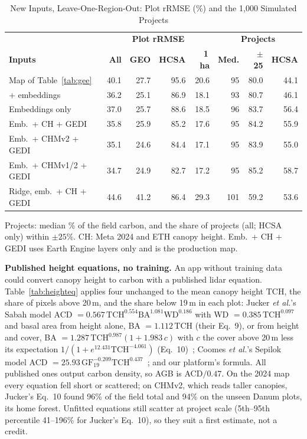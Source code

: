 \documentclass[conference,a4paper]{IEEEtran}
\begin{document}
\begin{table}[t]
\centering
\caption{New Inputs, Leave-One-Region-Out: Plot rRMSE (\%) and the 1{,}000 Simulated Projects}
\label{tab:prodinputs}
\footnotesize
\setlength{\tabcolsep}{1.6pt}
\begin{tabular}{@{}l r r r r r r r@{}}
\toprule
 & \multicolumn{4}{c}{\textbf{Plot rRMSE}} & \multicolumn{3}{c}{\textbf{Projects}}\\
\textbf{Inputs} & \textbf{All} & \textbf{GEO} & \textbf{HCSA} & \textbf{1\,ha} & \textbf{Med.} & \textbf{$\pm$25} & \textbf{HCSA}\\
\midrule
Map of Table~\ref{tab:gee} & 40.1 & 27.7 & 95.6 & 20.6 & 95 & 80.0 & 44.1\\
\quad + embeddings & 36.2 & 25.1 & 86.9 & 18.1 & 93 & 80.7 & 46.1\\
Embeddings only & 37.0 & 25.7 & 88.6 & 18.5 & 96 & 83.7 & 56.4\\
Emb.\ + CH + GEDI & 35.8 & 25.9 & 85.2 & 17.6 & 95 & 84.2 & 55.9\\
Emb.\ + CHMv2 + GEDI & 35.1 & 24.6 & 84.4 & 17.1 & 95 & 83.9 & 55.0\\
Emb.\ + CHMv1/2 + GEDI & 34.7 & 24.9 & 82.7 & 17.2 & 95 & 85.2 & 58.7\\
Ridge, emb.\ + CH + GEDI & 44.6 & 41.2 & 86.4 & 29.3 & 101 & 59.2 & 53.6\\
\bottomrule
\end{tabular}

\vspace{2pt}
{\scriptsize Projects: median \% of the field carbon, and the share of projects (all; HCSA only) within $\pm25$\%. CH: Meta 2024 and ETH canopy height. Emb.\ + CH + GEDI uses Earth Engine layers only and is the production map.\par}
\end{table}

\textbf{Published height equations, no training.} An app without training data could convert canopy height to carbon with a published lidar equation. Table~\ref{tab:heighteq} applies four unchanged to the mean canopy height TCH, the share of pixels above 20\,m, and the share below 19\,m in each plot: Jucker \textit{et al.}'s Sabah model ACD $=0.567\,\mathrm{TCH}^{0.554}\mathrm{BA}^{1.081}\mathrm{WD}^{0.186}$ with WD $=0.385\,\mathrm{TCH}^{0.097}$ and basal area from height alone, BA $=1.112\,\mathrm{TCH}$ (their Eq.~9), or from height and cover, BA $=1.287\,\mathrm{TCH}^{0.987}(1+1.983\,c)$ with $c$ the cover above 20\,m less its expectation $1/(1+e^{12.431}\mathrm{TCH}^{-4.061})$ (Eq.~10)~\cite{jucker2018estimating}; Coomes \textit{et al.}'s Sepilok model ACD $=25.93\,\mathrm{GF}_{19}^{-0.209}\mathrm{TCH}^{0.437}$~\cite{coomes2017area}; and our platform's formula. All published ones output carbon density, so AGB is ACD$/0.47$. On the 2024 map every equation fell short or scattered; on CHMv2, which reads taller canopies, Jucker's Eq.~10 found 96\% of the field total and 94\% on the unseen Danum plots, its home forest. Unfitted equations still scatter at project scale (5th--95th percentile 41--196\% for Jucker's Eq.~10), so they suit a first estimate, not a credit.
\end{document}
